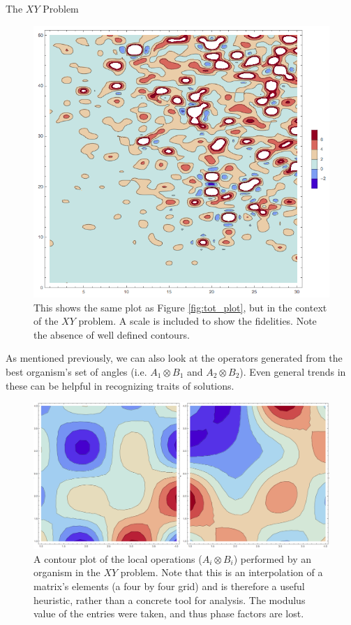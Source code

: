 \documentclass[12pt]{beamer}
\renewcommand{\maketitle}{%
	\begin{center}%
		\Huge\inserttitle\\[5mm]%
		\Large\insertauthor\\[5mm]%
		\Large\insertinstitute%
	\end{center}%
	\vspace*{-1.5ex}%
}
\begin{document}
\begin{frame}{\maketitle}
\begin{columns}
\begin{column}{.45\textwidth}
\begin{block}{The $XY$ Problem}
	\begin{figure}[htpb]
		\centering
			\includegraphics[scale=0.6]{xyPlot_50O_20G.png}
		\centering
		\caption{This shows the same plot as Figure \ref{fig:tot_plot}, but in the context of the $XY$ problem. A scale is included to show the fidelities. Note the absence of well defined contours.}
		\label{fig:xy_plot}
	\end{figure}    
    As mentioned previously, we can also look at the operators generated from the best organism's set of angles (i.e. $A_1 \otimes B_1$ and $A_2 \otimes B_2$). Even general trends in these can be helpful in recognizing traits of solutions.

    \begin{figure}[htpb]
		\centering
			\includegraphics[scale=0.4]{xy_test_matrices.png}
		\centering
		\caption{A contour plot of the local operations ($A_i \otimes B_i$) performed by an organism in the $XY$ problem. Note that this is an interpolation of a matrix's elements (a four by four grid) and is therefore a useful heuristic, rather than a concrete tool for analysis. The modulus value of the entries were taken, and thus phase factors are lost.}
		\label{fig:xy_matrix}
	\end{figure}


\end{block}
\end{column}
\end{columns}
\end{frame}
\end{document}
